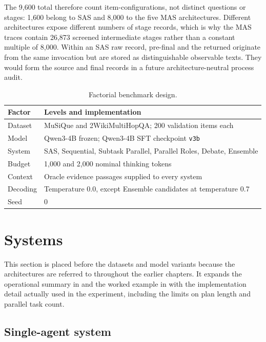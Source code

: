 The 9,600 total therefore count item-configurations, not distinct questions or stages: 1,600 belong to SAS and 8,000 to the five MAS architectures. Different architectures expose different numbers of stage records, which is why the MAS traces contain 26,873 screened intermediate stages rather than a constant multiple of 8,000. Within an SAS raw record, pre-final  and the returned  originate from the same invocation but are stored as distinguishable observable texts. They would form the source and final records in a future architecture-neutral process audit.

\begin{table}[htbp]
  \centering
  \caption[Factorial benchmark design]{Factorial benchmark design.}
  \label{tab:design}
  \begin{tabularx}{\textwidth}{@{}lX@{}}
    \toprule
    Factor & Levels and implementation \\
    \midrule
    Dataset & MuSiQue and 2WikiMultiHopQA; 200 validation items each \\
    Model & Qwen3-4B frozen; Qwen3-4B SFT checkpoint \texttt{v3b} \\
    System & SAS, Sequential, Subtask Parallel, Parallel Roles, Debate, Ensemble \\
    Budget & 1,000 and 2,000 nominal thinking tokens \\
    Context & Oracle evidence passages supplied to every system \\
    Decoding & Temperature 0.0, except Ensemble candidates at temperature 0.7 \\
    Seed & 0 \\
    \bottomrule
  \end{tabularx}
\end{table}

\section{Systems}

This section is placed before the datasets and model variants because the architectures are referred to throughout the earlier chapters. It expands the operational summary in  and the worked example in  with the implementation detail actually used in the experiment, including the limits on plan length and parallel task count.

\subsection{Single-agent system}

